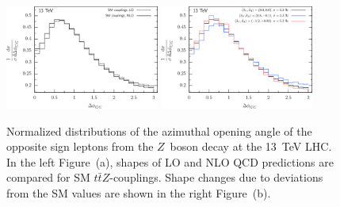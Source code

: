 \documentclass[preprint]{JHEP3}
\def\ttbZ{t\bar{t}Z}
\begin{document}
\begin{figure}[t]
\centering %
\includegraphics[width=0.45\textwidth]{./LHC_53_Fig17a.eps}
\hfill
\includegraphics[width=0.45\textwidth]{./LHC_53_Fig17b.eps}
\caption{\label{fig:vi}
Normalized distributions of the azimuthal opening angle of the opposite sign leptons from the $Z$~boson decay at the 13~TeV LHC.
In the left Figure~(a), shapes of LO and NLO QCD predictions are compared for SM $\ttbZ$-couplings.
Shape changes due to deviations from the SM values are shown in the right Figure~(b).
}
\end{figure}
\end{document}
